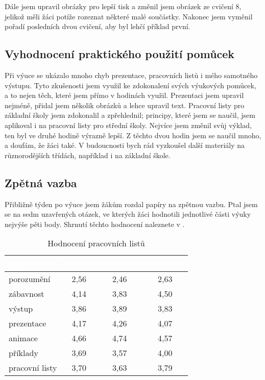 {Dále jsem upravil obrázky pro lepší tisk a změnil jsem obrázek ze cvičení 8, jelikož měli žáci potíže rozeznat některé malé součástky. Nakonec jsem vyměnil pořadí posledních dvou cvičení, aby byl lehčí příklad první.}
\subsection{Vyhodnocení praktického použití pomůcek}
{Při výuce se ukázalo mnoho chyb prezentace, pracovních listů i mého samotného výstupu. Tyto zkušenosti jsem využil ke zdokonalení svých výukových pomůcek, a to nejen těch, které jsem přímo v hodinách využil.}\odst
{Prezentaci jsem upravil nejméně, přidal jsem několik obrázků a lehce upravil text. Pracovní listy pro základní školy jsem zdokonalil a zpřehlednil; principy, které jsem se naučil, jsem aplikoval i na pracovní listy pro střední školy. Nejvíce jsem změnil svůj výklad, ten byl ve druhé hodině výrazně lepší.}\odst
{Z těchto dvou hodin jsem se naučil mnoho, a doufám, že žáci také. V budoucnosti bych rád vyzkoušel další materiály na různorodějších třídách, například i na základní škole.}
\newpage
\subsection{Zpětná vazba}
{Přibližně týden po výuce jsem žákům rozdal papíry na zpětnou vazbu. Ptal jsem se na sedm uzavřených otázek, ve kterých žáci hodnotili jednotlivé části výuky nejvýše pěti body. Shrnutí těchto hodnocení naleznete v .}
\begin{table}[H]
    \centering
    \begin{tabular}{|l|c|c|c|}
        \hline
        \rowcolor{gray}
        \textcolor{white}{název části} & \textcolor{white}{celkem} & \textcolor{white}{třída 2.B} & \textcolor{white}{třída 2.A}\\
        \hline
        porozumění & 2,56 & 2,46 & 2,63 \\
        \hline
        zábavnost & 4,14 & 3,83 & 4,50 \\
        \hline
        výstup & 3,86 & 3,89 & 3,83 \\
        \hline
        prezentace & 4,17 & 4,26 & 4,07 \\
        \hline
        animace & 4,66 & 4,74 & 4,57 \\
        \hline
        příklady & 3,69 & 3,57 & 4,00\\
        \hline
        pracovní listy & 3,70 & 3,63 & 3,79 \\
        \hline
    \end{tabular}
    \caption{Hodnocení pracovních listů \jaTab}
    \label{tab:zpetnaVazba}
\end{table}